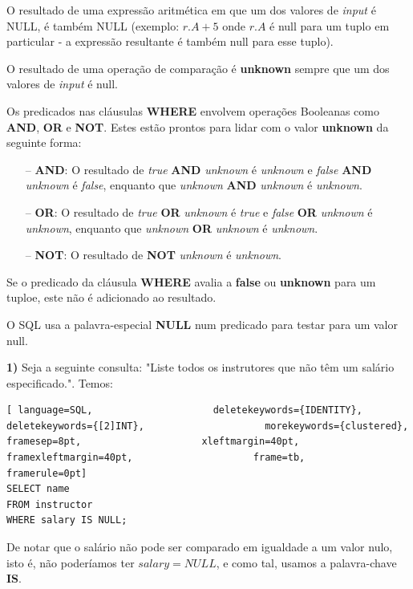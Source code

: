 \documentclass[oneside]{book}
\theoremstyle{definition}
\begin{document}
O resultado de uma expressão aritmética em que um dos valores de \textit{input} é NULL, é também NULL (exemplo: $r.A + 5$ onde $r.A$ é null para um tuplo em particular - a expressão resultante é também null para esse tuplo).

O resultado de uma operação de comparação é \textbf{unknown} sempre que um dos valores de \textit{input} é null.

Os predicados nas cláusulas \textbf{WHERE} envolvem operações Booleanas como \textbf{AND}, \textbf{OR} e \textbf{NOT}. Estes estão prontos para lidar com o valor \textbf{unknown} da seguinte forma:
\begin{itemize}
    \itemsep0cm
    \item[--]\textbf{AND}: O resultado de \textit{true} \textbf{AND} \textit{unknown} é \textit{unknown} e \textit{false} \textbf{AND} \textit{unknown} é \textit{false}, enquanto que \textit{unknown} \textbf{AND} \textit{unknown} é \textit{unknown}.
    \item[--]\textbf{OR}: O resultado de \textit{true} \textbf{OR} \textit{unknown} é \textit{true} e \textit{false} \textbf{OR} \textit{unknown} é \textit{unknown}, enquanto que \textit{unknown} \textbf{OR} \textit{unknown} é \textit{unknown}.
    \item[--]\textbf{NOT}: O resultado de \textbf{NOT} \textit{unknown} é \textit{unknown}.
\end{itemize}

Se o predicado da cláusula \textbf{WHERE} avalia a \textbf{false} ou \textbf{unknown} para um tuploe, este não é adicionado ao resultado.

O SQL usa a palavra-especial \textbf{NULL} num predicado para testar para um valor null.

\textbf{1)} Seja a seguinte consulta: "Liste todos os instrutores que não têm um salário especificado.". Temos:
\begin{lstlisting}[ language=SQL,                     deletekeywords={IDENTITY},                     deletekeywords={[2]INT},                     morekeywords={clustered},                     framesep=8pt,                     xleftmargin=40pt,                     framexleftmargin=40pt,                     frame=tb,                     framerule=0pt]
SELECT name
FROM instructor
WHERE salary IS NULL;
\end{lstlisting}

De notar que o salário não pode ser comparado em igualdade a um valor nulo, isto é, não poderíamos ter $salary = NULL$, e como tal, usamos a palavra-chave \textbf{IS}.
\end{document}

